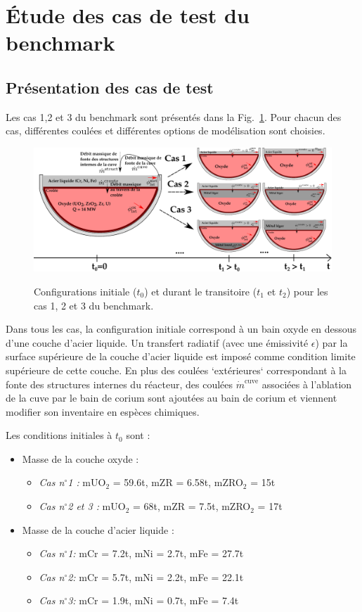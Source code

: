 \documentclass[3p]{elsarticle}
\begin{document}

\section{Étude des cas de test du benchmark}

\subsection{Présentation des cas de test}
Les cas 1,2 et 3 du benchmark sont présentés dans la Fig.~\ref{fig:TD_benchmark}. Pour chacun des cas, différentes coulées et différentes options de modélisation sont choisies.
\begin{figure}[H]
  \centering \includegraphics[width=\textwidth]{../Figures/TD_benchmark.pdf}
	\label{fig:TD_benchmark}
  \caption{Configurations initiale ($t_0$) et durant le transitoire ($t_1$ et $t_2$) pour les cas 1, 2 et 3 du benchmark.}
\end{figure} Dans tous les cas, la configuration initiale correspond à un bain oxyde en dessous d'une couche d'acier liquide. Un transfert radiatif (avec une émissivité $\epsilon$) par la surface supérieure de la couche d'acier liquide est imposé comme condition limite supérieure de cette couche. En plus des coulées `extérieures` correspondant à la fonte des structures internes du réacteur, des coulées $\dot{m}^{\text{cuve}}$ associées à l'ablation de la cuve par le bain de corium sont ajoutées au bain de corium et viennent modifier son inventaire en espèces chimiques.

Les conditions initiales à $t_0$ sont :
\begin{itemize}
	\item Masse de la couche oxyde :
	\begin{itemize}
		\item \emph{Cas n$^{\circ}$1 :} mUO$_2$ = 59.6t,  mZR = 6.58t, mZRO$_2$ = 15t
		\item \emph{Cas n$^{\circ}$2 et 3 :} mUO$_2$ = 68t,  mZR = 7.5t, mZRO$_2$ = 17t
	\end{itemize}
	\item Masse de la couche d'acier liquide :
	\begin{itemize}
		\item \emph{Cas n$^{\circ}$1:} mCr = 7.2t,  mNi = 2.7t, mFe = 27.7t
		\item \emph{Cas n$^{\circ}$2:} mCr = 5.7t,  mNi = 2.2t, mFe = 22.1t	
		\item \emph{Cas n$^{\circ}$3:} mCr = 1.9t,  mNi = 0.7t, mFe = 7.4t
	\end{itemize}
\end{itemize}
\end{document}
